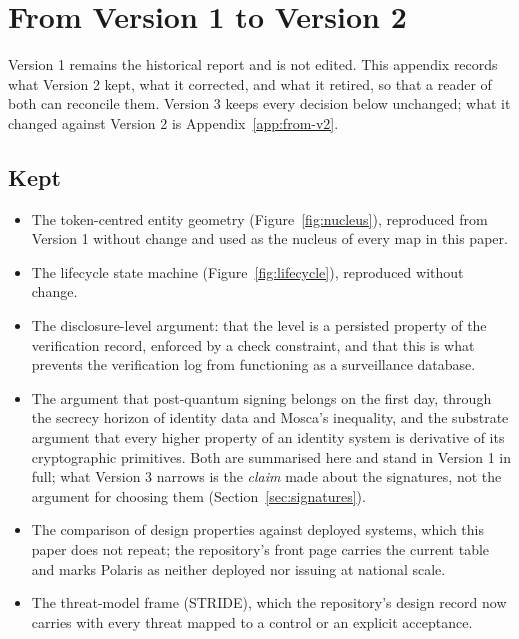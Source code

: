 \section{From Version 1 to Version 2}
\label{app:from-v1}

Version 1 remains the historical report and is not edited. This appendix records what Version 2
kept, what it corrected, and what it retired, so that a reader of both can reconcile them. Version 3
keeps every decision below unchanged; what it changed against Version 2 is Appendix~\ref{app:from-v2}.

\subsection*{Kept}

\begin{itemize}
  \item The token-centred entity geometry (Figure~\ref{fig:nucleus}), reproduced from Version 1
    without change and used as the nucleus of every map in this paper.
  \item The lifecycle state machine (Figure~\ref{fig:lifecycle}), reproduced without change.
  \item The disclosure-level argument: that the level is a persisted property of the verification
    record, enforced by a check constraint, and that this is what prevents the verification log from
    functioning as a surveillance database.
  \item The argument that post-quantum signing belongs on the first day, through the secrecy
    horizon of identity data and Mosca's inequality, and the substrate argument that every higher
    property of an identity system is derivative of its cryptographic primitives. Both are summarised
    here and stand in Version 1 in full; what Version 3 narrows is the \emph{claim} made about the
    signatures, not the argument for choosing them (Section~\ref{sec:signatures}).
  \item The comparison of design properties against deployed systems, which this paper does not
    repeat; the repository's front page carries the current table and marks Polaris as neither
    deployed nor issuing at national scale.
  \item The threat-model frame (STRIDE), which the repository's design record now carries with every
    threat mapped to a control or an explicit acceptance.
\end{itemize}

